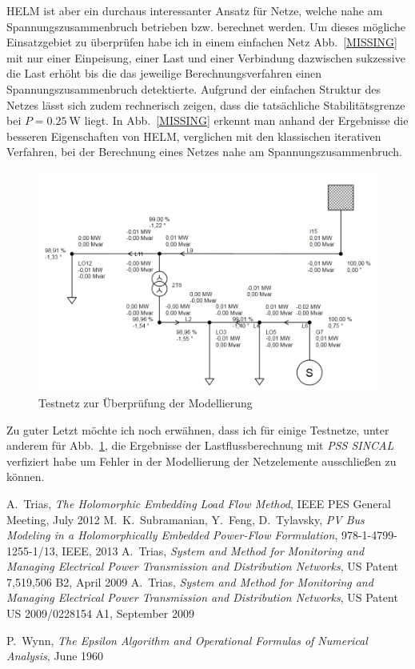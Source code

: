 \documentclass[12pt,a4paper]{article}
\newcommand{\reffig}[1]{{Abb.~\ref{#1}}}
\begin{document}
	HELM ist aber ein durchaus interessanter Ansatz für Netze, welche nahe am Spannungszusammenbruch betrieben bzw. berechnet werden. Um dieses mögliche Einsatzgebiet zu überprüfen habe ich in einem einfachen Netz \reffig{MISSING} mit nur einer Einpeisung, einer Last und einer Verbindung dazwischen sukzessive die Last erhöht bis die das jeweilige Berechnungsverfahren einen Spannungszusammenbruch detektierte. Aufgrund der einfachen Struktur des Netzes lässt sich zudem rechnerisch zeigen, dass die tatsächliche Stabilitätsgrenze bei $P = \SI{0.25}{\watt}$ liegt. In \reffig{MISSING} erkennt man anhand der Ergebnisse die besseren Eigenschaften von HELM, verglichen mit den klassischen iterativen Verfahren, bei der Berechnung eines Netzes nahe am Spannungszusammenbruch.
	
	\begin{figure}
		\centering
		\includegraphics[scale=0.55]{pictures/complete_powernet_modified}
		\caption{Testnetz zur Überprüfung der Modellierung}
		\label{fig:powernet_complete}
	\end{figure}
	
	Zu guter Letzt möchte ich noch erwähnen, dass ich für einige Testnetze, unter anderem für \reffig{fig:powernet_complete}, die Ergebnisse der Lastflussberechnung mit \emph{PSS SINCAL} verfiziert habe um Fehler in der Modellierung der Netzelemente ausschließen zu können.
	
	\begin{thebibliography}{1}
			A.~Trias, \emph{The Holomorphic Embedding Load Flow Method}, IEEE PES General Meeting, July 2012
			M.~K.~Subramanian, Y.~Feng, D.~Tylavsky, \emph{PV Bus Modeling in a Holomorphically Embedded Power-Flow Formulation}, 978-1-4799-1255-1/13, IEEE, 2013
			A.~Trias, \emph{System and Method for Monitoring and Managing Electrical Power Transmission and Distribution Networks}, US Patent 7,519,506 B2, April 2009
			A.~Trias, \emph{System and Method for Monitoring and Managing Electrical Power Transmission and Distribution Networks}, US Patent US 2009/0228154 A1, September 2009
			
			P.~Wynn, \emph{The Epsilon Algorithm and Operational Formulas of Numerical Analysis}, June 1960

	\end{thebibliography}
\end{document}
